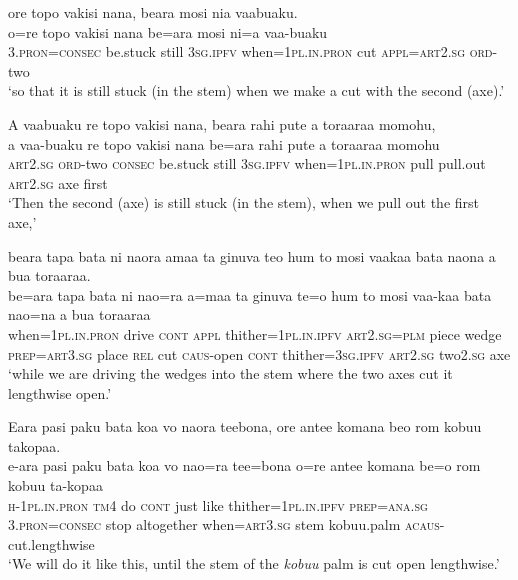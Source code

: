 \ea\label{ex:text15-18}
ore topo vakisi nana, beara mosi nia vaabuaku.\\
\gll o=re	topo	vakisi	nana	be=ara	mosi	ni=a	vaa-buaku\\
     3.\textsc{pron}=\textsc{consec}	be.stuck	still	3\textsc{sg}.\textsc{ipfv}	when=1\textsc{pl}.\textsc{in}.\textsc{pron}	cut	\textsc{appl}=\textsc{art}2.\textsc{sg}	\textsc{ord}-two\\
\glt `so that it is still stuck (in the stem) when we make a cut with the second (axe).'
\z

\newpage
\ea\label{ex:text15-19}
A vaabuaku re topo vakisi nana, beara rahi pute a toraaraa momohu,\\
\gll a	vaa-buaku	re	topo	vakisi	nana	be=ara	rahi	pute	a	toraaraa	momohu\\
     \textsc{art}2.\textsc{sg}	\textsc{ord}-two	\textsc{consec}	be.stuck	still	3\textsc{sg}.\textsc{ipfv}	when=1\textsc{pl}.\textsc{in}.\textsc{pron}	pull	pull.out	\textsc{art}2.\textsc{sg}	axe	first\\
\glt `Then the second (axe) is still stuck (in the stem), when we pull out the first axe,'
\z

\ea\label{ex:text15-20}
beara tapa bata ni naora amaa ta ginuva teo hum to mosi vaakaa bata naona a bua toraaraa.\\
\gll be=ara	tapa	bata	ni	nao=ra	a=maa	ta	ginuva	te=o	hum	to	mosi	vaa-kaa	bata	nao=na	a	bua	toraaraa\\
     when=1\textsc{pl}.\textsc{in}.\textsc{pron}	drive	\textsc{cont}	\textsc{appl}	thither=1\textsc{pl}.\textsc{in}.\textsc{ipfv}	\textsc{art}2.\textsc{sg}=\textsc{plm}	piece	wedge	\textsc{prep}=\textsc{art}3.\textsc{sg}	place	\textsc{rel}	cut	\textsc{caus}-open	\textsc{cont}	thither=3\textsc{sg}.\textsc{ipfv}	\textsc{art}2.\textsc{sg}	two2.\textsc{sg}	axe\\
\glt `while we are driving the wedges into the stem where the two axes cut it lengthwise open.'
\z

\ea\label{ex:text15-21}
Eara pasi paku bata koa vo naora teebona, ore antee komana beo rom kobuu takopaa.\\
\gll e-ara	pasi	paku	bata	koa	vo	nao=ra	tee=bona	o=re	antee	komana	be=o	rom	kobuu	ta-kopaa\\
     \textsc{h}-1\textsc{pl}.\textsc{in}.\textsc{pron}	\textsc{tm}4	do	\textsc{cont}	just	like	thither=1\textsc{pl}.\textsc{in}.\textsc{ipfv}	\textsc{prep}=\textsc{ana}.\textsc{sg}	3.\textsc{pron}=\textsc{consec}	stop	altogether	when=\textsc{art}3.\textsc{sg}	stem	kobuu.palm	\textsc{acaus}-cut.lengthwise\\
\glt `We will do it like this, until the stem of the \textit{kobuu} palm is cut open lengthwise.'
\z

